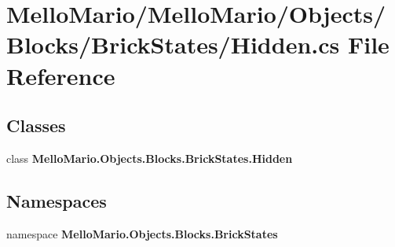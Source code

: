 \section{Mello\+Mario/\+Mello\+Mario/\+Objects/\+Blocks/\+Brick\+States/\+Hidden.cs File Reference}
\label{Blocks_2BrickStates_2Hidden_8cs}
\subsection*{Classes}
\begin{DoxyCompactItemize}
\item 
class \textbf{ Mello\+Mario.\+Objects.\+Blocks.\+Brick\+States.\+Hidden}
\end{DoxyCompactItemize}
\subsection*{Namespaces}
\begin{DoxyCompactItemize}
\item 
namespace \textbf{ Mello\+Mario.\+Objects.\+Blocks.\+Brick\+States}
\end{DoxyCompactItemize}
